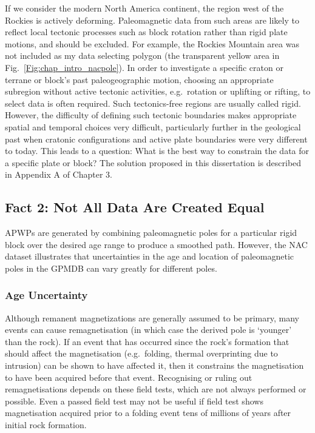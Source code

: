 If we consider the modern North America continent, the region west of the
Rockies is actively deforming. Paleomagnetic data from such areas are likely to
reflect local tectonic processes such as block rotation rather than rigid plate
motions, and should be excluded. For example, the Rockies Mountain area was not
included as my data selecting polygon (the transparent yellow area in
Fig.~\ref{Fig:chap_intro_nacpole}). In order to investigate a specific craton or
terrane or block's past paleogeographic motion, choosing an appropriate
subregion without active tectonic activities, e.g.\ rotation or uplifting or
rifting, to select data is often required. Such tectonics-free regions are
usually called rigid. However, the difficulty of defining such tectonic
boundaries makes appropriate spatial and temporal choices very difficult,
particularly further in the geological past when cratonic configurations and
active plate boundaries were very different to today. This leads to a question:
What is the best way to constrain the data for a specific plate or block? The
solution proposed in this dissertation is described in Appendix A of Chapter 3.

\subsection{Fact 2: Not All Data Are Created Equal}\label{sec:f2}

APWPs are generated by combining paleomagnetic poles for a particular rigid
block over the desired age range to produce a smoothed path. However, the NAC
dataset illustrates that uncertainties in the age and location of paleomagnetic
poles in the GPMDB can vary greatly for different poles.

\subsubsection{Age Uncertainty}\label{sec:ageu}

Although remanent magnetizations are generally assumed to be primary, many
events can cause remagnetisation (in which case the derived pole is `younger'
than the rock). If an event that has occurred since the rock's formation that
should affect the magnetisation (e.g.\ folding, thermal overprinting due to
intrusion) can be shown to have affected it, then it constrains the
magnetisation to have been acquired before that event. Recognising or ruling
out remagnetisations depends on these field tests, which are not always
performed or possible. Even a passed field test may not be useful if field test
shows magnetisation acquired prior to a folding event tens of millions of years
after initial rock formation.

